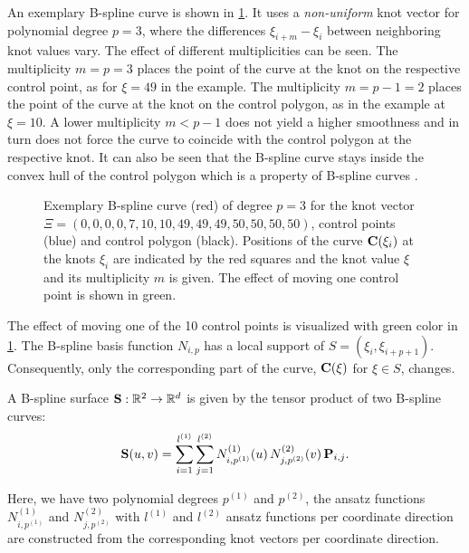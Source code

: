 An exemplary B-spline curve is shown in \cref{fig:bspline_curve}. It uses a \emph{non-uniform} knot vector for polynomial degree $p=3$, where the differences $\xi_{i+m} - \xi_i$ between neighboring knot values vary. The effect of different multiplicities can be seen. The multiplicity $m=p=3$ places the point of the curve at the knot on the respective control point, as for $\xi=49$ in the example. The multiplicity $m=p-1=2$ places the point of the curve at the knot on the control polygon, as in the example at $\xi=10$. A lower multiplicity $m < p-1$ does not yield a higher smoothness and in turn does not force the curve to coincide with the control polygon at the respective knot. It can also be seen that the B-spline curve stays inside the convex hull of the control polygon which is a property of B-spline curves \cite{piegl2012nurbs}.

\begin{figure}%
  \centering%
  \def\svgwidth{8cm}%
  \caption{Exemplary B-spline curve (red) of degree $p=3$ for the knot vector $\Xi = (0,0,0,0,7,10,10,49,49,49,50,50,50,50)$, control points (blue) and control polygon (black).
  Positions of the curve $\textbf{C}(\xi_i)$ at the knots $\xi_i$ are indicated by the red squares and the knot value $\xi$ and its multiplicity $m$ is given. The effect of moving one control point is shown in green.}%
  \label{fig:bspline_curve}%
\end{figure}%
%
The effect of moving one of the 10 control points is visualized with green color in \cref{fig:bspline_curve}.
The B-spline basis function $N_{i,p}$ has a local support of $S=(\xi_i,\xi_{i+p+1})$. Consequently, only the corresponding part of the curve, $\textbf{C}(\xi)$ for $\xi \in S$, changes.

A B-spline surface $\textbf{S} : \mathbb{R}^2 \to \mathbb{R}^d$ is given by the tensor product of two B-spline curves:
\begin{equation}\label{eq:bspline_surface}
  \begin{array}{lll}
    \textbf{S}(u,v) = \displaystyle\sum\limits_{i=1}^{l^{(1)}}\displaystyle\sum\limits_{j=1}^{l^{(2)}} N^{(1)}_{i,p^{(1)}}(u)\,N^{(2)}_{j,p^{(2)}}(v)\, \textbf{P}_{i,j}.
  \end{array}
\end{equation}

Here, we have two polynomial degrees $p^{(1)}$ and $p^{(2)}$, the ansatz functions $N^{(1)}_{i,p^{(1)}}$ and $N^{(2)}_{j,p^{(2)}}$ with $l^{(1)}$ and $l^{(2)}$ ansatz functions per coordinate direction are constructed from the corresponding knot vectors per coordinate direction.

